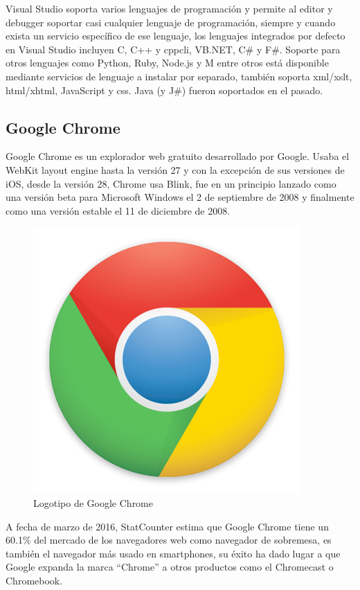 Visual Studio soporta varios lenguajes de programación y permite al editor y debugger soportar casi cualquier lenguaje de programación, siempre y cuando exista un servicio específico de ese lenguaje, los lenguajes integrados por defecto en Visual Studio incluyen C, C++ y \acrshort{cppcli}, VB.NET, C\# y F\#. Soporte para otros lenguajes como Python, Ruby, Node.js y M entre otros está disponible mediante servicios de lenguaje a instalar por separado, también soporta \acrshort{xml}/\acrshort{xslt}, \acrshort{html}/\acrshort{xhtml}, JavaScript y \acrshort{css}. Java (y J\#) fueron soportados en el pasado.


\subsection{Google Chrome}

Google Chrome\cite{Chrome} es un explorador web gratuito desarrollado por Google. Usaba el WebKit layout engine hasta la versión 27 y con la excepción de sus versiones de iOS, desde la versión 28, Chrome usa Blink, fue en un principio lanzado como una versión beta para Microsoft Windows el 2 de septiembre de 2008 y finalmente como una versión estable el 11 de diciembre de 2008.

\begin{figure}[!htp]
	 \centering
	 \includegraphics[scale=0.3]{fig/googleChrome_logo}
	 \caption{Logotipo de Google Chrome}
\end{figure}

A fecha de marzo de 2016, StatCounter estima que Google Chrome tiene un 60.1\% del mercado de los navegadores web como navegador de sobremesa, es también el navegador más usado en smartphones, su éxito ha dado lugar a que Google expanda la marca “Chrome” a otros productos como el Chromecast o Chromebook.

